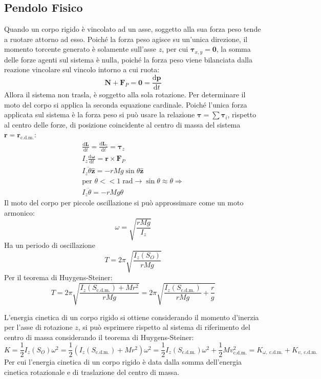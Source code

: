 \documentclass{article}
\newcommand{\vect}[1]{\boldsymbol{\mathbf{#1}}}
\newcommand{\df}{\mathrm{d}}
\numberwithin{equation}{subsection}
\begin{document}
\subsection{Pendolo Fisico}
Quando un corpo rigido è vincolato ad un asse, soggetto 
alla sua forza peso tende a ruotare attorno ad esso. 
Poiché la forza peso agisce su un'unica direzione, il momento torcente generato è solamente sull'asse $z$, per cui $\vect{\tau}_{x,y}=\vect{0}$, 
la somma delle forze agenti sul sistema è nulla, poiché 
la forza peso viene bilanciata dalla reazione vincolare sul vincolo intorno a cui ruota: 
\begin{equation*}
    \vect{N}+\vect{F}_P=\vect{0}=\displaystyle\frac{\df\vect{p}}{\df t}
\end{equation*}
Allora il sistema non trasla, è soggetto alla sola rotazione. 
Per determinare il moto del corpo si applica la seconda 
equazione cardinale. Poiché l'unica forza applicata sul sistema è la forza peso si può usare la relazione $\vect{\tau}=\sum\vect{\tau}_i$, rispetto al 
centro delle forze, di posizione coincidente al centro di massa del sistema $\vect{r}=\vect{r}_{\mathrm{c.d.m.}}$:
\begin{gather*}
    \displaystyle\frac{\df\vect{L}}{\df t}=\frac{\df\vect{L}_z}{\df t}=\vect{\tau}_z\\
    I_z\displaystyle\frac{\df\vect{\omega}}{\df t}=\vect{r}\times\vect{F}_P\\
    I_z\ddot\theta\hat{\vect{z}}=-rMg\sin\theta\hat{\vect{z}}\\
    \mbox{per }\theta<<1\;\mathrm{rad}\rightarrow \sin\theta\approx\theta\Rightarrow\\
    I_z\ddot\theta=-rMg\theta
\end{gather*}
Il moto del corpo per piccole oscillazione si può approssimare come un moto armonico: 
\begin{equation}
    \omega=\displaystyle\sqrt{\displaystyle\frac{rMg}{I_z}}
\end{equation}
Ha un periodo di oscillazione 
\begin{equation*}
    T=2\pi\displaystyle\sqrt{\frac{I_z(S_O)}{rMg}}
\end{equation*}
Per il teorema di Huygens-Steiner: 
\begin{equation}
    T=2\pi\sqrt{\frac{I_z(S_{\mathrm{c.d.m.}})+Mr^2}{rMg}}=2\pi\sqrt{\frac{I_z(S_{\mathrm{c.d.m.}})}{rMg}+\frac{r}{g}}
\end{equation}


L'energia cinetica di un corpo rigido si ottiene considerando il momento d'inerzia per l'asse di rotazione $z$, si può esprimere rispetto al sistema di riferimento 
del centro di massa considerando il teorema di Huygens-Steiner:
\begin{equation*}
    K=\displaystyle\frac{1}{2}I_z(S_O)\omega^2=\frac{1}{2}(I_z(S_{\mathrm{c.d.m.}})+Mr^2)\omega^2=\frac{1}{2}I_z(S_{\mathrm{c.d.m.}})\omega^2+\frac{1}{2}Mv_{\mathrm{c.d.m.}}^2=K_{\omega,\:\mathrm{c.d.m.}}+K_{v,\:\mathrm{c.d.m.}}
\end{equation*}
Per cui l'energia cinetica di un corpo rigido è data dalla somma dell'energia cinetica rotazionale e di traslazione del centro di massa. 
\end{document}
